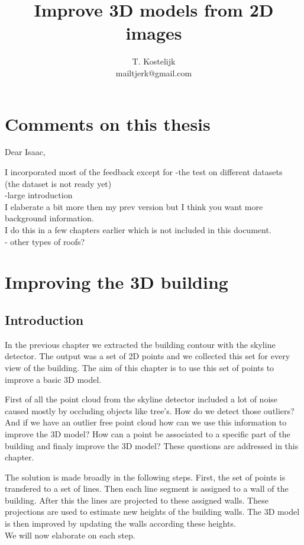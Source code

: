 \documentclass[10pt]{article}
\title{\sc Improve 3D models from 2D images}
\author{T. Kostelijk\\mailtjerk@gmail.com}
\begin{document}
\maketitle




\section{Comments on this thesis}
Dear Isaac,

I incorporated most of the feedback except for
-the test on different datasets\\
(the dataset is not ready yet)\\
-large introduction\\
I elaberate a bit more then my prev version but I think you want more background
information.\\
I do this in a few chapters earlier which is not included in this document.\\
- other types of roofs?\\

\section{Improving the 3D building}
\subsection{Introduction}
In the previous chapter we extracted the building contour with the skyline
detector. The output was a set of 2D points and we collected this set for every
view of the building.  The aim of this chapter is to use this set of points to
improve a basic 3D model.

First of all the point cloud from the skyline detector included a lot of noise caused mostly
by occluding objects like tree's. How do we detect those outliers?
And if we have an outlier free point cloud how can we use this information to
improve the 3D model? How can a point be associated to a specific part of the
building and finaly improve the 3D model? 
These questions are addressed in this chapter.

The solution is made broadly in the following steps. First, the set of points is transfered to a set of
lines. Then each line segment is assigned to a wall of the building. After this 
the lines are projected to these assigned walls. 
These projections are used to estimate new heights of the building walls.
The 3D model is then improved by updating the walls according these heights. \\
 We will now elaborate on each step.
\end{document}

